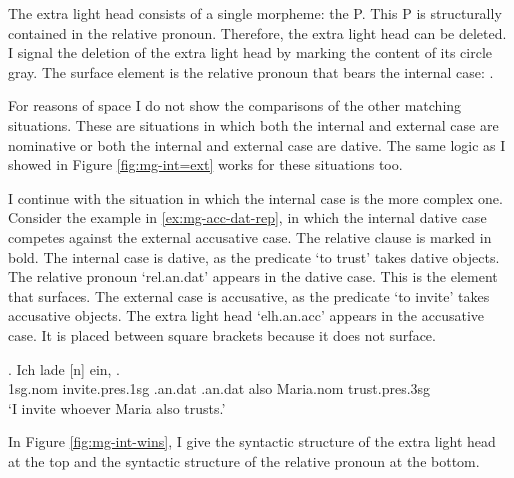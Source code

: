 The extra light head consists of a single morpheme: the P.
This P is structurally contained in the relative pronoun. Therefore, the extra light head can be deleted. I signal the deletion of the extra light head by marking the content of its circle gray.
The surface element is the relative pronoun that bears the internal case: .

For reasons of space I do not show the comparisons of the other matching situations. These are situations in which both the internal and external case are nominative or both the internal and external case are dative. The same logic as I showed in Figure \ref{fig:mg-int=ext} works for these situations too.

I continue with the situation in which the internal case is the more complex one.
Consider the example in \ref{ex:mg-acc-dat-rep}, in which the internal dative case competes against the external accusative case. The relative clause is marked in bold.
The internal case is dative, as the predicate  `to trust' takes dative objects. The relative pronoun  `\ac{rel}.\ac{an}.\ac{dat}' appears in the dative case. This is the element that surfaces.
The external case is accusative, as the predicate  `to invite' takes accusative objects. The extra light head  `\ac{elh}.\ac{an}.\ac{acc}' appears in the accusative case. It is placed between square brackets because it does not surface.

\exg. Ich lade [n] ein,    .\\
1\ac{sg}.\ac{nom} invite.\ac{pres}.1\ac{sg}\scsub{[acc]} .\ac{an}.\ac{dat} {} .\ac{an}.\ac{dat} also Maria.\ac{nom} trust.\ac{pres}.3\ac{sg}\scsub{[dat]}\\
`I invite whoever Maria also trusts.' \label{ex:mg-acc-dat-rep}

In Figure \ref{fig:mg-int-wins}, I give the syntactic structure of the extra light head at the top and the syntactic structure of the relative pronoun at the bottom.

